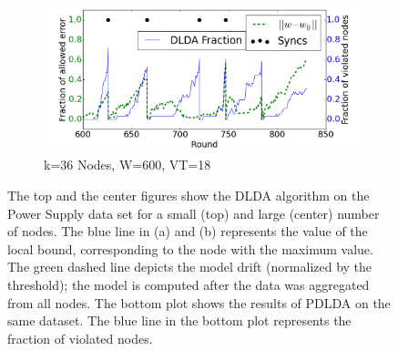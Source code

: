 \begin{figure}
    \begin{subfigure}[b]{0.5\textwidth}
        \includegraphics[width=\textwidth]{graphics/36nodesProb.png}
        \caption{k=36 Nodes, W=600, VT=18}
    \end{subfigure}
    \caption{The top and the center figures show the DLDA algorithm on the Power Supply data set for a small (top) and large (center) number of nodes. The blue line in (a) and (b) represents the value of the local bound, corresponding to the node with the maximum value. The green dashed line depicts the model drift (normalized by the threshold); the model is computed after the data was aggregated from all nodes. The bottom plot shows the results of PDLDA on the same dataset. The blue line in the bottom plot represents the fraction of violated nodes.}\label{PowerSupplyFigures}
    \label{powerSupply}
\end{figure}
%
